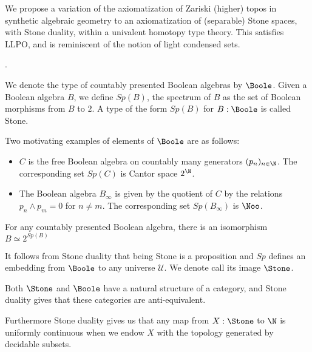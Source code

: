 We propose a variation of
the axiomatization of Zariski (higher) topos in synthetic algebraic geometry
to an axiomatization of (separable) Stone spaces, with Stone duality,
within a univalent homotopy type theory.  This satisfies LLPO, and is reminiscent
of the notion of light condensed sets.

\cite{draft}. 

\medskip

We denote the type of countably presented Boolean algebras by $\Boole$.
Given a Boolean algebra $B$, we define $Sp(B)$, the spectrum of $B$ as the set of 
Boolean morphisms from $B$ to $2$. 
 A type of the form $Sp(B)$ for $B:\Boole$ is called Stone.


 Two motivating examples of elements of $\Boole$ are as follows:
 \begin{itemize}
   \item $C$ is the free Boolean algebra on countably many generators $(p_n)_{n\in\N}$. 
     The corresponding set $Sp(C)$ is Cantor space $2^\N$. 
   \item The Boolean algebra $ B_\infty$ is given by the quotient of $C$ by the relations $p_n\wedge p_m = 0$ for $n\neq m$. 
 The corresponding set $Sp(B_\infty)$ is $\Noo$. 
  \end{itemize} 

\begin{axiom}
  For any countably presented Boolean algebra, there is an isomorphism $B \simeq 2^{Sp(B)}$
\end{axiom}
It follows from Stone duality that being Stone is a proposition and $Sp$ defines an embedding from $\Boole$ 
to any universe $\mathcal U$. We denote call its image $\Stone$. 

Both $\Stone$ and $\Boole$ have a natural structure of a category, and 
Stone duality gives that these categories are anti-equivalent. 

Furthermore Stone duality gives us that any map from $X:\Stone$ to $\N$ is uniformly continuous
when we endow $X$ with the topology generated by decidable subsets. 


